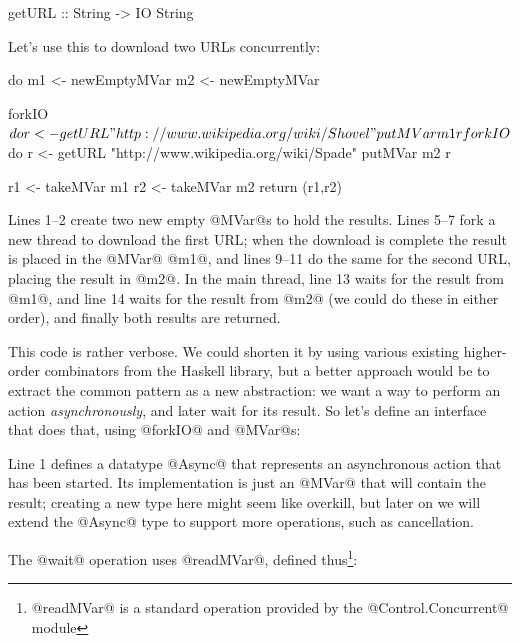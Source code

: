\begin{haskell}
getURL :: String -> IO String
\end{haskell}

\noindent Let's use this to download two URLs concurrently:

\begin{numhaskell}
do
   m1 <- newEmptyMVar
   m2 <- newEmptyMVar

   forkIO $ do
     r <- getURL "http://www.wikipedia.org/wiki/Shovel"
     putMVar m1 r

   forkIO $ do
     r <- getURL "http://www.wikipedia.org/wiki/Spade"
     putMVar m2 r

   r1 <- takeMVar m1
   r2 <- takeMVar m2
   return (r1,r2)
\end{numhaskell}

\noindent Lines 1--2 create two new empty @MVar@s to hold the
results.  Lines 5--7 fork a new thread to download the first URL; when
the download is complete the result is placed in the @MVar@ @m1@, and
lines 9--11 do the same for the second URL, placing the result in @m2@.
In the main thread, line 13 waits for the result from @m1@, and line 14
waits for the result from @m2@ (we could do these in either order), and
finally both results are returned.

This code is rather verbose.  We could shorten it by using various
existing higher-order combinators from the Haskell library, but a
better approach would be to extract the common pattern as a new
abstraction: we want a way to perform an action \emph{asynchronously},
and later wait for its result.  So let's define an interface that does
that, using @forkIO@ and @MVar@s:


\noindent Line 1 defines a datatype @Async@ that represents an
asynchronous action that has been started.  Its implementation is just
an @MVar@ that will contain the result; creating a new type here might
seem like overkill, but later on we will extend the @Async@ type to
support more operations, such as cancellation.

The @wait@ operation uses @readMVar@, defined
thus\footnote{@readMVar@ is a standard operation provided by
  the @Control.Concurrent@ module}:

